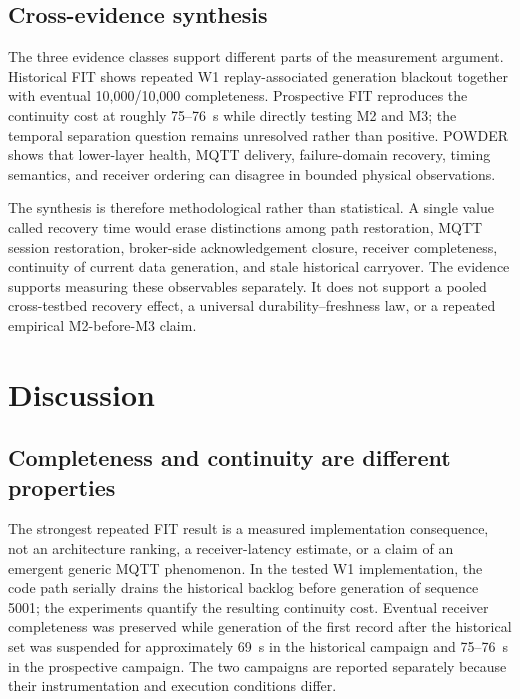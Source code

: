 \documentclass[journal]{IEEEtran}
\begin{document}
\subsection{Cross-evidence synthesis}

The three evidence classes support different parts of the measurement argument. Historical FIT shows repeated W1 replay-associated generation blackout together with eventual 10,000/10,000 completeness. Prospective FIT reproduces the continuity cost at roughly 75--76~s while directly testing M2 and M3; the temporal separation question remains unresolved rather than positive. POWDER shows that lower-layer health, MQTT delivery, failure-domain recovery, timing semantics, and receiver ordering can disagree in bounded physical observations.

The synthesis is therefore methodological rather than statistical. A single value called recovery time would erase distinctions among path restoration, MQTT session restoration, broker-side acknowledgement closure, receiver completeness, continuity of current data generation, and stale historical carryover. The evidence supports measuring these observables separately. It does not support a pooled cross-testbed recovery effect, a universal durability--freshness law, or a repeated empirical M2-before-M3 claim.

\section{Discussion}
\label{sec:discussion}

\subsection{Completeness and continuity are different properties}

The strongest repeated FIT result is a measured implementation consequence, not an architecture ranking, a receiver-latency estimate, or a claim of an emergent generic MQTT phenomenon. In the tested W1 implementation, the code path serially drains the historical backlog before generation of sequence 5001; the experiments quantify the resulting continuity cost. Eventual receiver completeness was preserved while generation of the first record after the historical set was suspended for approximately 69~s in the historical campaign and 75--76~s in the prospective campaign. The two campaigns are reported separately because their instrumentation and execution conditions differ.
\end{document}
